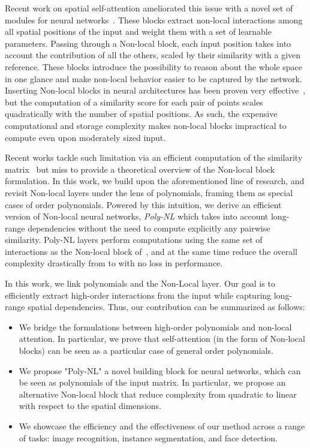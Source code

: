 \documentclass[10pt,twocolumn,letterpaper]{article}
\begin{document}
Recent work on spatial self-attention ameliorated this issue with a novel set of modules for neural networks~\cite{wang2018non, vaswani2017attention}. These blocks extract non-local interactions among all spatial positions of the input and weight them with a set of learnable parameters. Passing through a Non-local block, each input position takes into account the contribution of all the others, scaled by their similarity with a given reference. These blocks introduce the possibility to reason about the whole space in one glance and make non-local behavior easier to be captured by the network. Inserting Non-local blocks in neural architectures has been proven very effective~\cite{Bello_2019_ICCV,dai2019second,wang2019edvr,ott2018scaling,ramachandran2019stand, mohamed2019transformers}, but the computation of a similarity score for each pair of points scales quadratically with the number of spatial positions. As such, the expensive computational and storage complexity makes non-local blocks impractical to compute even upon moderately sized input. 

Recent works tackle such limitation via an efficient computation of the similarity matrix~\cite{zhang2019latentgnn, liu2019spatially, shen2021efficient} but miss to provide a theoretical overview of the Non-local block formulation. 
In this work, we build upon the aforementioned line of research, and revisit Non-local layers under the lens of polynomials, framing them as special cases of  order polynomials. Powered by this intuition, we derive an efficient version of Non-local neural networks, \textit{Poly-NL} which takes into account long-range dependencies without the need to compute explicitly any pairwise similarity. Poly-NL layers perform computations using the same set of interactions as the Non-local block of~\cite{wang2018non}, and at the same time reduce the overall complexity drastically from  to  with no loss in performance.

In this work, we link polynomials and the Non-Local layer. Our goal is to efficiently extract high-order interactions from the input while capturing long-range spatial dependencies. Thus, our contribution can be summarized as follows:
\begin{itemize}
    \item We bridge the formulations between high-order polynomials and non-local attention. In particular, we prove that self-attention (in the form of Non-local blocks) can be seen as a particular case of general  order polynomials.

    \item We propose "Poly-NL" a novel building block for neural networks, which can be seen as polynomials of the input matrix. In particular, we propose an alternative Non-local block that reduce complexity from quadratic to linear with respect to the spatial dimensions. 
    
    \item We showcase the efficiency and the effectiveness of our method across a range of tasks: image recognition, instance segmentation, and face detection.
    
\end{itemize}
\end{document}
